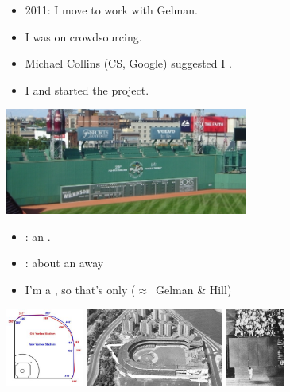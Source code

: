 \documentclass[9pt]{report}
\begin{document}
  
\begin{itemize}
\item 2011: I move  to work with 
  Gelman. 
\item I was  on crowdsourcing. 
\item Michael Collins (CS, Google) suggested I .
\item I  and started the  project.
\end{itemize}
\begin{center}
  \spc\includegraphics[width=0.6\textwidth]{img/fenway-fences.jpeg}
\end{center}


  
\begin{itemize}
  \item {}: an .
  \item {}: about an  away
  \item I'm a , so that's only   \hfill   ($\approx$\ Gelman \& Hill) 
  \end{itemize}
\vfill
\begin{center}
  \spc
  \includegraphics[height=1in]{img/yankee-stadium.jpeg}
  \hfill
  \spc\includegraphics[height=1in]{img/polo-grounds.jpeg}
  \hfill
  \spc\includegraphics[height=1in]{img/willie-mays.jpeg}
\end{center}
\end{document}
